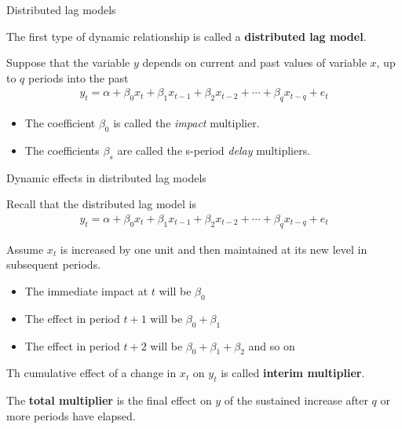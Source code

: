 \documentclass[10pt,aspectratio=169]{beamer}  %
\begin{document}

\begin{frame}{Distributed lag models}

    \bigskip

    The first type of dynamic relationship is called a \textbf{distributed lag model}.

    \medskip
    Suppose that the variable $ y $ depends on current and past values of variable $ x $, up to $ q $ periods into the past
    \begin{align*}
        y_{t} = \alpha + \beta_{0} x_{t} + \beta_{1} x_{t-1} + \beta_{2} x_{t-2} + \cdots + \beta_{q} x_{t-q} + e_{t}
    \end{align*}

    \medskip
    \begin{itemize}
        \item The coefficient $ \beta_{0} $ is called the \textit{impact} multiplier.
        \item The coefficients $ \beta_{s} $ are called the s-period \textit{delay} multipliers.
    \end{itemize}

\end{frame}


\begin{frame}{Dynamic effects in distributed lag models}

    \bigskip

    Recall that the distributed lag model is
    \begin{align*}
        y_{t} = \alpha + \beta_{0} x_{t} + \beta_{1} x_{t-1} + \beta_{2} x_{t-2} + \cdots + \beta_{q} x_{t-q} + e_{t}
    \end{align*}

    Assume $ x_{t} $ is increased by one unit and then maintained at its new level in subsequent periods.
    \begin{itemize}
        \item The immediate impact at $ t $ will be $ \beta_{0} $
        \item The effect in period $ t + 1 $ will be $ \beta_{0} + \beta_{1} $
        \item The effect in period $ t + 2 $ will be $ \beta_{0} + \beta_{1} + \beta_{2} $ and so on
    \end{itemize}

    Th cumulative effect of a change in $ x_{t} $ on $ y_{t} $ is called \textbf{interim multiplier}.

    The \textbf{total multiplier} is the final effect on $ y $ of the sustained increase after $ q $ or more periods have elapsed.

\end{frame}
\end{document}
